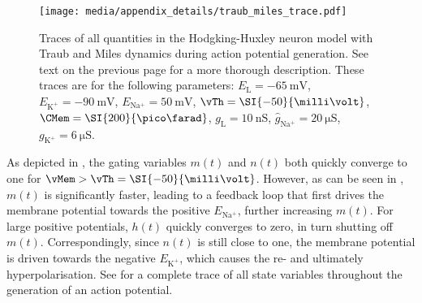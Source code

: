 \begin{figure}[p]
	\centering
	\texttt{[image: media/appendix\_details/traub\_miles\_trace.pdf]}
	\caption[State of the Hodgkin-Huxley model during action potential generation]{Traces of all quantities in the Hodgking-Huxley neuron model with Traub and Miles dynamics during action potential generation. See text on the previous page for a more thorough description. These traces are for the following parameters: $E_\mathrm{L} = \SI{-65}{\milli\volt}$, $E_\mathrm{K^+} = \SI{-90}{\milli\volt}$, $E_\mathrm{Na^+} = \SI{50}{\milli\volt}$, $\vTh = \SI{-50}{\milli\volt}$, $\CMem = \SI{200}{\pico\farad}$, $g_\mathrm{L} = \SI{10}{\nano\siemens}$, $\hat g_\mathrm{Na^+} = \SI{20}{\micro\siemens}$, $g_\mathrm{K^+} = \SI{6}{\micro\siemens}$.}
	\label{fig:traub_miles_trace}
\end{figure}

As depicted in , the gating variables $m(t)$ and $n(t)$ both quickly converge to one for $\vMem > \vTh = \SI{-50}{\milli\volt}$.
However, as can be seen in , $m(t)$ is significantly faster, leading to a feedback loop that first drives the membrane potential towards the positive $E_\mathrm{Na^+}$, further increasing $m(t)$.
For large positive potentials, $h(t)$ quickly converges to zero, in turn shutting off $m(t)$.
Correspondingly, since $n(t)$ is still close to one, the membrane potential is driven towards the negative $E_\mathrm{K^+}$, which causes the re- and ultimately hyperpolarisation.
See  for a complete trace of all state variables throughout the generation of an action potential.
